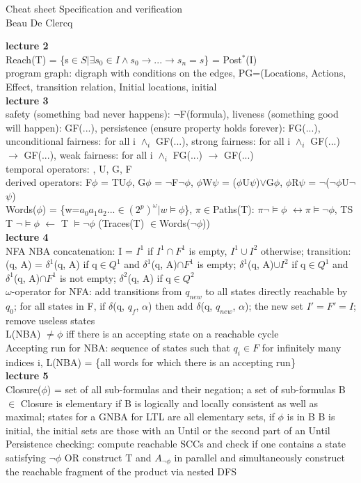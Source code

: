\documentclass[12pt]{article}
\begin{document}
\scriptsize\noindent
\begin{center}
	Cheat sheet Specification and verification\\
	Beau De Clercq
\end{center}
\textbf{lecture 2}\\
Reach(T) = \{s$\in S | \exists s_0 \in I\wedge s_0\rightarrow...\rightarrow s_n = s$\} = Post$^*$(I)\\
program graph: digraph with conditions on the edges, PG=(Locations, Actions, Effect, transition relation, Initial locations, initial \\\textbf{lecture 3}\\
safety (something bad never happens): $\neg$F(formula), liveness (something good will happen): GF(...), persistence (ensure property holds forever): FG(...), unconditional fairness: for all i $\wedge_i$ GF(...), strong fairness: for all i $\wedge_i$ GF(...) $\rightarrow$ GF(...), weak fairness: for all i $\wedge_i$ FG(...) $\rightarrow$ GF(...)\\
temporal operators: \Circle, U, G, F\\
derived operators: F$\phi$ = TU$\phi$, G$\phi$ = $\neg$F$\neg$$\phi$, $\phi$W$\psi$ = ($\phi$U$\psi$)$\vee$G$\phi$, $\phi$R$\psi$ = $\neg$($\neg$$\phi$U$\neg$$\psi$)\\
Words($\phi$) = \{w=$a_0a_1a_2...\in (2^p)^\omega | w \models \phi$\}, $\pi$$\in$Paths(T): $\pi$$\neg\models\phi$ $\leftrightarrow$$\pi\models\neg$$\phi$, TS T $\neg\models\phi$ $\leftarrow$ T $\models\neg$$\phi$ (Traces(T) $\in$Words($\neg$$\phi$))
\\\textbf{lecture 4}\\
NFA NBA concatenation: I = $I^1$ if $I^1\cap F^1$ is empty, $I^1\cup I^2$ otherwise; transition: (q, A) = $\delta^1$(q, A) if q$\in$$Q^1$ and $\delta^1$(q, A)$\cap$$F^1$ is empty;  $\delta^1$(q, A)$\cup$$I^2$ if q$\in$$Q^1$ and $\delta^1$(q, A)$\cap$$F^1$ is not empty; $\delta^2$(q, A) if q$\in$$Q^2$\\
$\omega$-operator for NFA: add transitions from $q_{new}$ to all states directly reachable by $q_0$; for all states in F, if $\delta$(q, $q_f$, $\alpha$) then add $\delta$(q, $q_{new}$, $\alpha$); the new set $I' = F' = I$; remove useless states\\
L(NBA) $\neq \phi$ iff there is an accepting state on a reachable cycle\\
Accepting run for NBA: sequence of states such that $q_i \in F$ for infinitely many indices i, L(NBA) = \{all words for which there is an accepting run\}
\\\textbf{lecture 5}\\
Closure($\phi$) = set of all sub-formulas and their negation; a set of sub-formulas B $\in$ Closure is elementary if B is logically and locally consistent as well as maximal; states for a GNBA for LTL are all elementary sets, if $\phi$ is in B B is initial, the initial sets are those with an Until or the second part of an Until\\
Persistence checking: compute reachable SCCs and check if one contains a state satisfying $\neg$$\phi$ OR construct T and $A_{\neg\phi}$ in parallel and simultaneously construct the reachable fragment of the product via nested DFS\\
\end{document}
